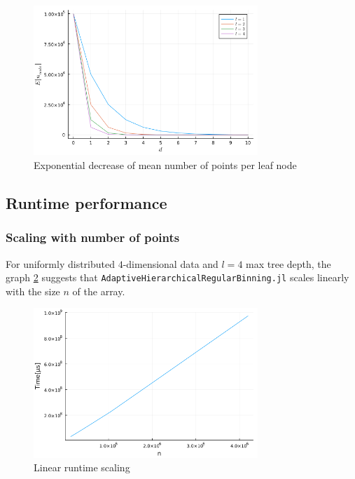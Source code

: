 \documentclass{juliacon}
\begin{document}
\begin{figure}[!ht]
  \centerline{
    \includegraphics[width=20pc]{figures/experiments/b_vs_d.png}
  }
  \caption{ Exponential decrease of mean number of points per leaf node }
  \label{b_vs_d}
\end{figure}


\subsection{Runtime performance}
\subsubsection{Scaling with number of points}
For uniformly distributed $4$-dimensional data and $l=4$ max tree depth, the graph
\ref{scale_n} suggests that \verb|AdaptiveHierarchicalRegularBinning.jl| scales
linearly with the size $n$ of the array.

\begin{figure}[!ht]
  \centerline{
    \includegraphics[width=20pc]{figures/experiments/scale_n.png}
  }
  \caption{ Linear runtime scaling }
  \label{scale_n}
\end{figure}
\end{document}
